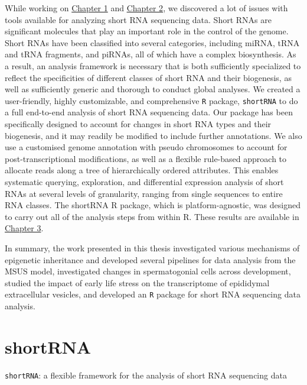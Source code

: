 \documentclass[12pt,twoside]{reedthesis}
\begin{document}
While working on \protect\hyperlink{chapter1}{Chapter 1} and \protect\hyperlink{chapter2}{Chapter 2}, we discovered a lot of issues with tools available for analyzing short RNA sequencing data. Short RNAs are significant molecules that play an important role in the control of the genome. Short RNAs have been classified into several categories, including miRNA, tRNA and tRNA fragments, and piRNAs, all of which have a complex biosynthesis. As a result, an analysis framework is necessary that is both sufficiently specialized to reflect the specificities of different classes of short RNA and their biogenesis, as well as sufficiently generic and thorough to conduct global analyses. We created a user-friendly, highly customizable, and comprehensive \texttt{R} package, \texttt{shortRNA} to do a full end-to-end analysis of short RNA sequencing data. Our package has been specifically designed to account for changes in short RNA types and their biogenesis, and it may readily be modified to include further annotations. We also use a customised genome annotation with pseudo chromosomes to account for post-transcriptional modifications, as well as a flexible rule-based approach to allocate reads along a tree of hierarchically ordered attributes. This enables systematic querying, exploration, and differential expression analysis of short RNAs at several levels of granularity, ranging from single sequences to entire RNA classes. The shortRNA R package, which is platform-agnostic, was designed to carry out all of the analysis steps from within R. These results are available in \protect\hyperlink{chapter3}{Chapter 3}.

In summary, the work presented in this thesis investigated various mechanisms of epigenetic inheritance and developed several pipelines for data analysis from the MSUS model, investigated changes in spermatogonial cells across development, studied the impact of early life stress on the transcriptome of epididymal extracellular vesicles, and developed an \texttt{R} package for short RNA sequencing data analysis.

\hypertarget{chapter3}{%
\chapter{shortRNA}\label{chapter3}}

\begingroup\LARGE

\texttt{shortRNA}: a flexible framework for the analysis of short RNA sequencing data
\begingroup\Large
\normalsize
\end{document}
